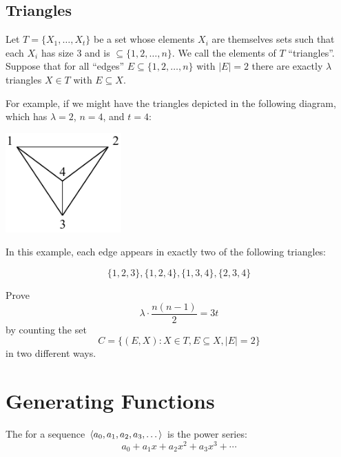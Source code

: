 \documentclass[12pt]{article}
\begin{document}
\subsection*{Triangles}
Let $T=\{X_1,\ldots, X_t\}$ be a set whose elements $X_i$ are themselves
sets such that each $X_i$ has size 3 and is $\subseteq \{1,2,\ldots, n\}$.
We call the elements of $T$ ``triangles''. Suppose that for all
``edges'' $E\subseteq \{1,2,\ldots, n\}$ with $|E|=2$ there are exactly
$\lambda$ triangles $X\in T$ with $E\subseteq X$.

For example, if we might have the triangles depicted in the following
diagram, which has $\lambda = 2$, $n = 4$, and $t = 4$:

\begin{center}
\includegraphics[height=1.5in]{triangles2}
\end{center}

In this example, each edge appears in exactly two of the following triangles:

$$\{1, 2, 3\}, \{1, 2, 4\}, \{1, 3, 4\}, \{2, 3, 4\}$$

Prove
$$ \lambda \cdot \frac{n(n-1)}{2} = 3t$$
by counting the set
$$C= \{ (E,X) : X\in T, E\subseteq X, |E|=2\}$$
in two different ways.


\section{Generating Functions}
The  for a sequence $\left\langle a_0, a_1,
a_2, a_3, \dots\right\rangle$ is the power series:
%
\[
a_0 + a_1 x + a_2 x^2 + a_3 x^3 + \cdots
\]
\end{document}
